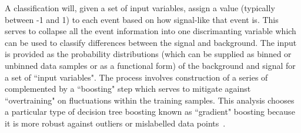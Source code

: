 A classification \BDT will, given a set of input variables, assign a value (typically between -1 and 1) to each event based on how signal-like that event is. This serves to collapse all the event information into one discrimanting variable which can be used to classify differences between the signal and background. The input is provided as the probability distributions (which can be supplied as binned or unbinned data samples or as a functional form) of the background and signal for a set of ``input variables". The process involves construction of a series of \DTs complemented by a ``boosting" step which serves to mitigate against ``overtraining" on fluctuations within the training samples. This analysis chooses a particular type of decision tree boosting known as ``gradient" boosting because it is more robust against outliers or mislabelled data points~\cite{TMVA}.

